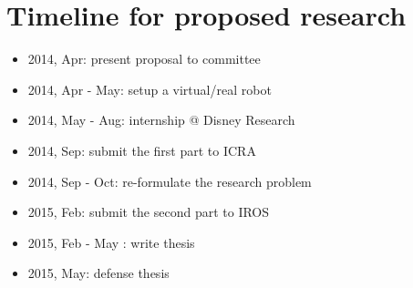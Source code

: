 \chapter{Timeline for proposed research}

\begin{itemize}
  \item 2014, Apr: present proposal to committee
  \item 2014, Apr - May: setup a virtual/real robot 
  \item 2014, May - Aug: internship @ Disney Research
  \item 2014, Sep: submit the first part to ICRA
  \item 2014, Sep - Oct: re-formulate the research problem 
  \item 2015, Feb: submit the second part to IROS
  \item 2015, Feb - May : write thesis
  \item 2015, May: defense thesis
\end{itemize}
